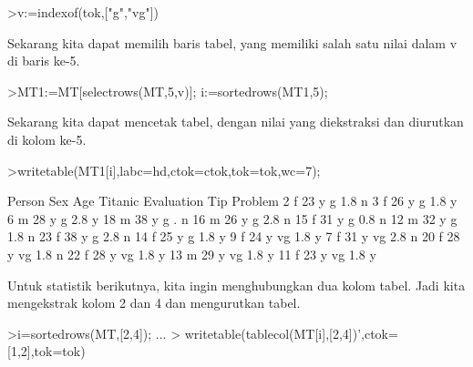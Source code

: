 \documentclass[a4paper,10pt]{article}
\begin{document}
\begin{eulernotebook}
\begin{eulerprompt}
>v:=indexof(tok,["g","vg"])
\end{eulerprompt}
\begin{euleroutput}
  [5,  6]
\end{euleroutput}
\begin{eulercomment}
Sekarang kita dapat memilih baris tabel, yang memiliki salah satu
nilai dalam v di baris ke-5.
\end{eulercomment}
\begin{eulerprompt}
>MT1:=MT[selectrows(MT,5,v)]; i:=sortedrows(MT1,5);
\end{eulerprompt}
\begin{eulercomment}
Sekarang kita dapat mencetak tabel, dengan nilai yang diekstraksi dan
diurutkan di kolom ke-5.
\end{eulercomment}
\begin{eulerprompt}
>writetable(MT1[i],labc=hd,ctok=ctok,tok=tok,wc=7);
\end{eulerprompt}
\begin{euleroutput}
   Person    Sex    Age Titanic Evaluation    Tip Problem
        2      f     23       y          g    1.8       n
        3      f     26       y          g    1.8       y
        6      m     28       y          g    2.8       y
       18      m     38       y          g      .       n
       16      m     26       y          g    2.8       n
       15      f     31       y          g    0.8       n
       12      m     32       y          g    1.8       n
       23      f     38       y          g    2.8       n
       14      f     25       y          g    1.8       y
        9      f     24       y         vg    1.8       y
        7      f     31       y         vg    2.8       n
       20      f     28       y         vg    1.8       n
       22      f     28       y         vg    1.8       y
       13      m     29       y         vg    1.8       y
       11      f     23       y         vg    1.8       y
\end{euleroutput}
\begin{eulercomment}
Untuk statistik berikutnya, kita ingin menghubungkan dua kolom tabel.
Jadi kita mengekstrak kolom 2 dan 4 dan mengurutkan tabel.
\end{eulercomment}
\begin{eulerprompt}
>i=sortedrows(MT,[2,4]);  ...
>  writetable(tablecol(MT[i],[2,4])',ctok=[1,2],tok=tok)
\end{eulerprompt}
\begin{euleroutput}

\end{euleroutput}
\end{eulernotebook}
\end{document}
